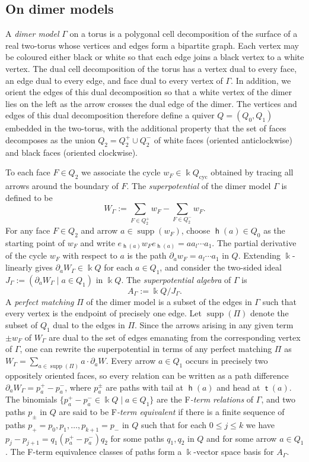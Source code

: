 \documentclass[11pt,a4paper]{amsart}
\numberwithin{equation}{section}
\theoremstyle{definition}
\theoremstyle{remark}
\newcommand{\kk}{\ensuremath{\Bbbk}}
\newcommand{\head}{\operatorname{\mathsf{h}}}
\newcommand{\supp}{\operatorname{supp}}
\newcommand{\tail}{\operatorname{\mathsf{t}}}
\begin{document}
 \subsection{On dimer models}
  A \emph{dimer model} $\Gamma$ on a torus is a polygonal cell decomposition of the surface of a real two-torus whose vertices and edges form a bipartite graph. Each vertex may be coloured either black or white so that each edge joins a black vertex to a white vertex. The dual cell decomposition of the torus has a vertex dual to every face, an edge dual to every edge, and face dual to every vertex of $\Gamma$.  In addition, we orient the edges of this dual decomposition so that a white vertex of the dimer lies on the left as the arrow crosses the dual edge of the dimer. The vertices and edges of this dual decomposition therefore define a quiver $Q=(Q_0, Q_1)$ embedded in the two-torus, with the additional property that the set of faces decomposes as the union $Q_2 = Q_2^+\cup Q_2^-$ of white faces (oriented anticlockwise) and black faces (oriented clockwise). 
  
To each face $F\in Q_2$ we associate the cycle  $w_F\in \kk Q_{\mathrm{cyc}}$ obtained by tracing all arrows around the boundary of $F$. The \emph{superpotential} of the dimer model $\Gamma$ is defined to be
  \[
  W_\Gamma := \sum_{F\in Q_2^+} w_F - \sum_{F\in Q_2^-} w_F.
  \]
For any face $F\in Q_2$ and arrow $a\in \supp(w_F)$,  choose $\head(a)\in Q_0$ as the starting point of $w_F$ and write $e_{\head(a)}w_Fe_{\head(a)} = aa_{l}\cdots a_1$. The partial derivative of the cycle $w_F$ with respect to $a$ is the path $\partial_a w_F = a_l\cdots a_1$ in $Q$. Extending $\kk$-linearly gives $\partial_a W_\Gamma\in \kk Q$ for each $a\in Q_1$, and consider the two-sided ideal $J_\Gamma:= (\partial_a W_\Gamma \mid a\in Q_1)$ in $\kk Q$. The \emph{superpotential algebra} of $\Gamma$ is
 \[
 A_\Gamma:=\kk Q/J_{\Gamma}.
 \]
 A \emph{perfect matching} $\Pi$ of the dimer model is a subset of the edges in $\Gamma$ such that every vertex is the endpoint of precisely one edge. Let $\supp(\Pi)$ denote the subset of $Q_1$ dual to the edges in $\Pi$. Since the arrows arising in any given term $\pm w_F$ of $W_\Gamma$ are dual to the set of edges emanating from the corresponding vertex of $\Gamma$, one can rewrite the superpotential in terms of any perfect matching $\Pi$ as $W_\Gamma = \sum_{a\in \supp(\Pi)} a\cdot \partial_a W$. Every arrow $a\in Q_1$ occurs in precisely two oppositely oriented faces, so every relation can be written as a path difference $\partial_aW_\Gamma = p_a^+ - p_a^-$, where $p_a^{\pm}$ are paths with tail at $\head(a)$ and head at $\tail(a)$. The binomials $\{p_a^+ -p_a^- \in \kk Q\mid a\in Q_1\}$ are the F\emph{-term relations} of $\Gamma$, and two paths $p_\pm$ in $Q$ are said to be F\emph{-term equivalent} if there is a finite sequence of paths $p_+=p_0, p_1, \dots, p_{k+1}=p_-$ in $Q$ such that for each $0\leq j\leq k$ we have $p_j- p_{j+1}=q_1(p_a^+-p_a^-)q_2$ for some paths $q_1, q_2$ in $Q$ and for some arrow $a\in Q_1$.   The F-term equivalence classes of paths form a $\kk$-vector space basis for $A_\Gamma$.
\end{document}
